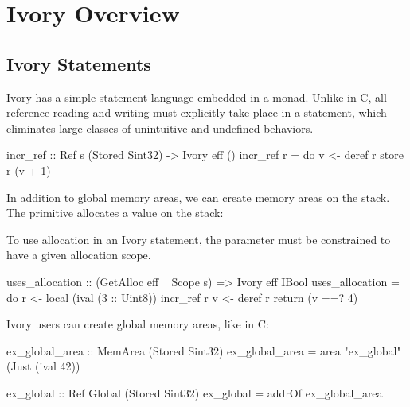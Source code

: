 \section{Ivory Overview}
\label{sec:ivory-overview}



\subsection{Ivory Statements}


Ivory has a simple statement language embedded in a monad. Unlike in C, all
reference reading and writing must explicitly take place in a statement, which
eliminates large classes of unintuitive and undefined behaviors.


\begin{code}
incr_ref :: Ref s (Stored Sint32) -> Ivory eff ()
incr_ref r = do
    v <- deref r
    store r (v + 1)
\end{code}


In addition to global memory areas, we can create memory areas on the stack.
The  primitive allocates a value on the stack:

To use allocation in an Ivory statement, the  parameter must be
constrained to have a given allocation scope.


\begin{code}

uses_allocation :: (GetAlloc eff ~ Scope s)
                => Ivory eff IBool
uses_allocation = do
  r <- local (ival (3 :: Uint8))
  incr_ref r
  v <- deref r
  return (v ==? 4)

\end{code}

Ivory users can create global memory areas, like in C:
\begin{code}
ex_global_area :: MemArea (Stored Sint32)
ex_global_area = area "ex_global" (Just (ival 42))

ex_global :: Ref Global (Stored Sint32)
ex_global = addrOf ex_global_area
\end{code}

